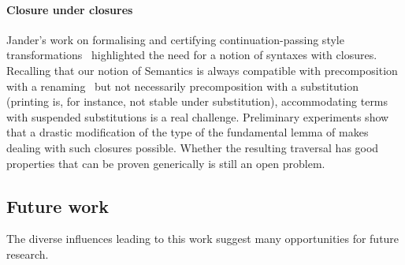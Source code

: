 \paragraph*{Closure under closures} Jander's work on formalising and certifying
continuation-passing style transformations~\cite{Jander:Thesis:2019}
highlighted the need for a notion of syntaxes with closures. Recalling
that our notion of Semantics is always compatible with precomposition
with a renaming~\cite{Kaiser-wsdebr} but not necessarily
precomposition with a substitution (printing is, for instance, not
stable under substitution), accommodating terms with suspended
substitutions is a real challenge. Preliminary experiments show that a
drastic modification of the type of the fundamental lemma of
 makes dealing with such closures possible. Whether the
resulting traversal has good properties that can be proven generically
is still an open problem.

\subsection{Future work}

The diverse influences leading to this work suggest many opportunities for
future research.

